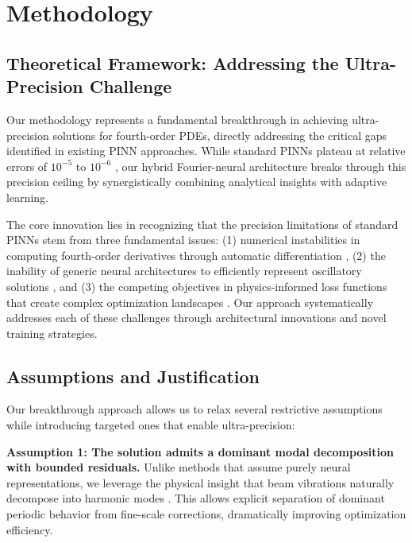 \section{Methodology}\label{sec:method}

\subsection{Theoretical Framework: Addressing the Ultra-Precision Challenge}

Our methodology represents a fundamental breakthrough in achieving ultra-precision solutions for fourth-order PDEs, directly addressing the critical gaps identified in existing PINN approaches. While standard PINNs plateau at relative errors of $10^{-5}$ to $10^{-6}$ \cite{vahab2022physics,kapoor2023physics}, our hybrid Fourier-neural architecture breaks through this precision ceiling by synergistically combining analytical insights with adaptive learning.

The core innovation lies in recognizing that the precision limitations of standard PINNs stem from three fundamental issues: (1) numerical instabilities in computing fourth-order derivatives through automatic differentiation \cite{hu2024hutchinson}, (2) the inability of generic neural architectures to efficiently represent oscillatory solutions \cite{brunton2024machine}, and (3) the competing objectives in physics-informed loss functions that create complex optimization landscapes \cite{wang2021understanding,krishnapriyan2021characterizing}. Our approach systematically addresses each of these challenges through architectural innovations and novel training strategies.

\subsection{Assumptions and Justification}

Our breakthrough approach allows us to relax several restrictive assumptions while introducing targeted ones that enable ultra-precision:

\textbf{Assumption 1: The solution admits a dominant modal decomposition with bounded residuals.}
Unlike methods that assume purely neural representations, we leverage the physical insight that beam vibrations naturally decompose into harmonic modes \cite{han1999dynamics}. This allows explicit separation of dominant periodic behavior from fine-scale corrections, dramatically improving optimization efficiency.

